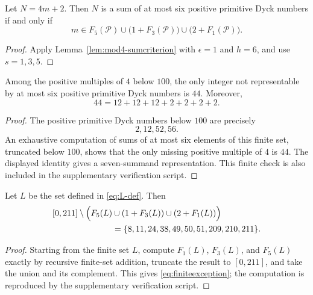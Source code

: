 \documentclass{ws-ijfcs}
\newcommand{\Pset}{\mathcal P}
\begin{document}
\begin{corollary}\label{cor:sixcriterion}
Let $N=4m+2$.  Then $N$ is a sum of at most six positive primitive Dyck
numbers if and only if
\begin{equation}\label{eq:sixcriterion}
 m\in F_5(\Pset)
 \cup\bigl(1+F_3(\Pset)\bigr)
 \cup\bigl(2+F_1(\Pset)\bigr).
\end{equation}
\end{corollary}

\begin{proof}
Apply Lemma~\ref{lem:mod4-sumcriterion} with
$\epsilon=1$ and $h=6$, and use $s=1,3,5$.
\end{proof}

\begin{lemma}\label{lem:smallmultiples}
Among the positive multiples of $4$ below $100$, the only integer not
representable by at most six positive primitive Dyck numbers is $44$.
Moreover,
\[
 44=12+12+12+2+2+2+2.
\]
\end{lemma}

\begin{proof}
The positive primitive Dyck numbers below $100$ are precisely
\[
 2,12,52,56.
\]
An exhaustive computation of sums of at most six elements of this finite
set, truncated below $100$, shows that the only missing positive multiple
of $4$ is $44$.  The displayed identity gives a seven-summand
representation.  This finite check is also included in the supplementary
verification script.
\end{proof}

\begin{lemma}\label{lem:finiteexception}
Let $L$ be the set defined in \eqref{eq:L-def}.  Then
\begin{equation}\label{eq:finiteexception}
\begin{split}
 [0,211]\setminus\Bigl(
 F_5(L)&\cup(1+F_3(L))\cup(2+F_1(L))\Bigr)\\
 &=\{8,11,24,38,49,50,51,209,210,211\}.
\end{split}
\end{equation}
\end{lemma}

\begin{proof}
Starting from the finite set $L$, compute $F_1(L)$, $F_3(L)$, and
$F_5(L)$ exactly by recursive finite-set addition, truncate the result to
$[0,211]$, and take the union and its complement.  This gives
\eqref{eq:finiteexception}; the computation is reproduced by the
supplementary verification script.
\end{proof}
\end{document}
